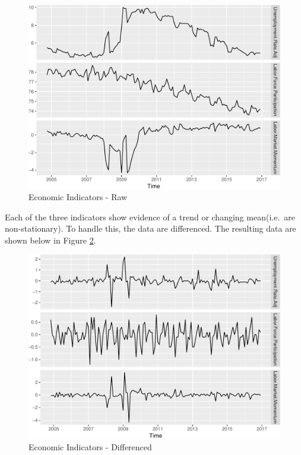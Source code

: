 \documentclass[12pt,letterpaper,toc=flat,oneside]{report}
\theoremstyle{definition}
\theoremstyle{definition}
\theoremstyle{definition}
\theoremstyle{remark}
\begin{document}
\begin{figure}[H]

{\centering \includegraphics{elliott-econometric-personnel-retention-18_files/figure-latex/econ-vars-1-1} 

}

\caption{Economic Indicators - Raw}\label{fig:econ-vars-1}
\end{figure}

Each of the three indicators show evidence of a trend or changing
mean(i.e.~are non-stationary). To handle this, the data are differenced.
The resulting data are shown below in Figure \ref{fig:econ-vars-2}.

\begin{figure}[H]

{\centering \includegraphics{elliott-econometric-personnel-retention-18_files/figure-latex/econ-vars-2-1} 

}

\caption{Economic Indicators - Differenced}\label{fig:econ-vars-2}
\end{figure}
\end{document}
